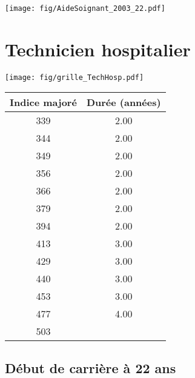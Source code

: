  \vspace{0.1cm} 

 \begin{center}\texttt{[image: fig/AideSoignant\_2003\_22.pdf]}\end{center} \label{fig/AideSoignant_2003_22.pdf} 

\newpage 
 
\chapter{Technicien hospitalier} 

\begin{minipage}{0.55\linewidth}\texttt{[image: fig/grille\_TechHosp.pdf]}\end{minipage} 
\begin{minipage}{0.3\linewidth} 
 \begin{center} 

\begin{tabular}[htb]{|c|c|} 
\hline 
 Indice majoré &  Durée (années) \\ 
\hline \hline 
 339 &  2.00 \\ 
\hline 
 344 &  2.00 \\ 
\hline 
 349 &  2.00 \\ 
\hline 
 356 &  2.00 \\ 
\hline 
 366 &  2.00 \\ 
\hline 
 379 &  2.00 \\ 
\hline 
 394 &  2.00 \\ 
\hline 
 413 &  3.00 \\ 
\hline 
 429 &  3.00 \\ 
\hline 
 440 &  3.00 \\ 
\hline 
 453 &  3.00 \\ 
\hline 
 477 &  4.00 \\ 
\hline 
 503 &   \\ 
\hline 
\hline 
\end{tabular} 
\end{center} 
 \end{minipage} 


 \addto{\captionsenglish}{ \renewcommand{\mtctitle}{}} \setcounter{minitocdepth}{2} 
 \minitoc \newpage 

\section{Début de carrière à 22 ans} 

